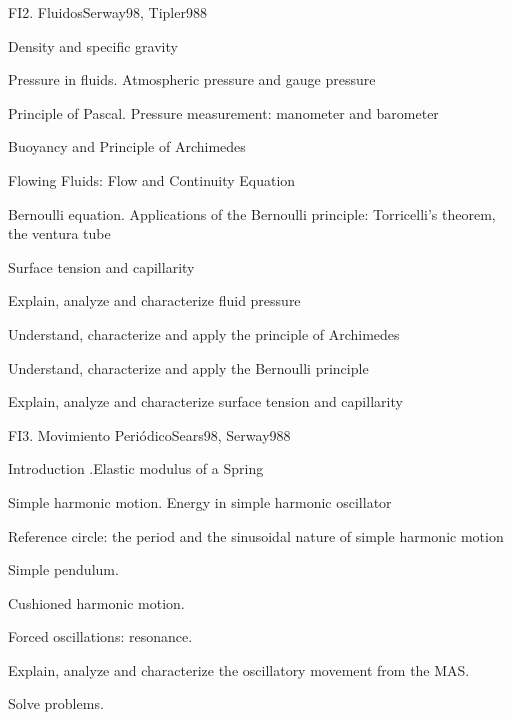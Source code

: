 \begin{syllabus}
\begin{unit}{FI2. Fluidos}{Serway98, Tipler98}{8}
\begin{topics}
         \item  Density and specific gravity
	 \item  Pressure in fluids. Atmospheric pressure and gauge pressure
         \item  Principle of Pascal. Pressure measurement: manometer and barometer
	 \item  Buoyancy and Principle of Archimedes
         \item  Flowing Fluids: Flow and Continuity Equation
	 \item  Bernoulli equation. Applications of the Bernoulli principle: Torricelli's theorem, the ventura tube
         \item  Surface tension and capillarity
   \end{topics}

   \begin{unitgoals}
         \item  Explain, analyze and characterize fluid pressure
         \item  Understand, characterize and apply the principle of Archimedes
         \item  Understand, characterize and apply the Bernoulli principle
         \item  Explain, analyze and characterize surface tension and capillarity
   \end{unitgoals}
\end{unit}

\begin{unit}{FI3. Movimiento Periódico}{Sears98, Serway98}{8}
\begin{topics}
         \item  Introduction .Elastic modulus of a Spring
	 \item  Simple harmonic motion. Energy in simple harmonic oscillator
         \item  Reference circle: the period and the sinusoidal nature of simple harmonic motion
	 \item  Simple pendulum.
         \item  Cushioned harmonic motion.
         \item  Forced oscillations: resonance.
   \end{topics}

   \begin{unitgoals}
         \item  Explain, analyze and characterize the oscillatory movement from the MAS.
         \item  Solve problems.
   \end{unitgoals}
\end{unit}


\end{syllabus}

